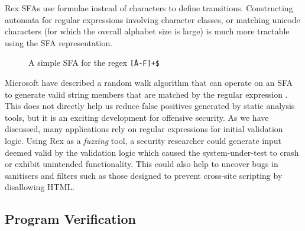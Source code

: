 \documentclass[a4paper,openany,12pt]{book}
\begin{document}
Rex SFAs use formulae instead of characters to define transitions.
Constructing automata for regular expressions involving character classes, or matching unicode characters (for which
the overall alphabet size is large) is much more tractable using the SFA representation.

\begin{figure}[H]
    \begin{MyMdframed}
        \vspace{0.5em}
        \caption{\label{figure:sfa:1} A simple SFA for the regex \texttt{\^[A-F]+\$}}
        \vspace{0.5em}
        \captionsetup{style=default}


        \vspace{0.5em}
    \end{MyMdframed}
\end{figure}

Microsoft have described a random walk algorithm that can operate on an SFA to generate valid string members that are
matched by the regular expression \citep{rexapp}.
This does not directly help us reduce false positives generated by static analysis tools, but it is an exciting
development for offensive security.
As we have discussed, many applications rely on regular expressions for initial validation logic.
Using Rex as a \emph{fuzzing} tool, a security researcher could generate input deemed valid by the validation logic
which caused the system-under-test to crash or exhibit unintended functionality.
This could also help to uncover bugs in sanitisers and filters such as those designed to prevent cross-site scripting by
disallowing HTML.

\subsection{Program Verification}
\end{document}
